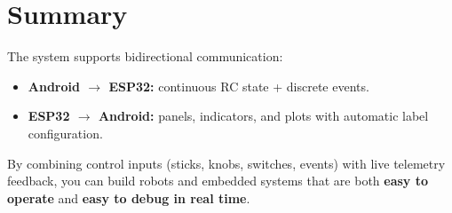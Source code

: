 \section{Summary}
\label{sec:practical-summary}

The system supports bidirectional communication:

\begin{itemize}
    \item \textbf{Android \(\rightarrow\) ESP32:} continuous RC state + discrete events.
    \item \textbf{ESP32 \(\rightarrow\) Android:} panels, indicators, and plots with automatic label configuration.
\end{itemize}

By combining control inputs (sticks, knobs, switches, events) with live telemetry feedback, you can build
robots and embedded systems that are both \textbf{easy to operate} and \textbf{easy to debug in real time}.